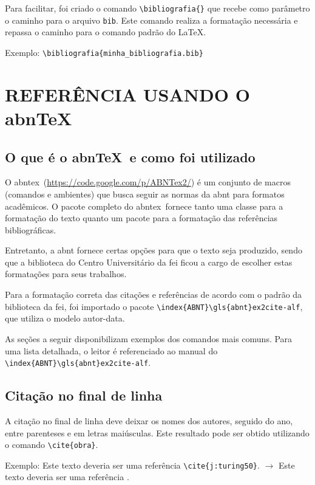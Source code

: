 \documentclass{fei}
\begin{document}
    Para facilitar, foi criado o comando \verb+\bibliografia{}+ que recebe como parâmetro o caminho para o arquivo \texttt{bib}. Este comando realiza a formatação necessária e repassa o caminho para o comando \verb++ padrão do \LaTeX.

    Exemplo: \verb+\bibliografia{minha_bibliografia.bib}+

\chapter{REFERÊNCIA USANDO O abn\TeX}\label{chap:referencia}

    \section{O que é o abn\TeX~e como foi utilizado}

    O \gls{abntex}~(\url{https://code.google.com/p/ABNTex2/}) é um conjunto de macros (comandos e ambientes) que busca seguir as normas da \gls{abnt} para formatos acadêmicos. O pacote completo do \gls{abntex}~fornece tanto uma classe para a formatação do texto quanto um pacote para a formatação das referências bibliográficas.

    Entretanto, a \gls{abnt} fornece certas opções para que o texto seja produzido, sendo que a biblioteca do Centro Universitário da \gls{fei} ficou a cargo de escolher estas formatações para seus trabalhos.

    Para a formatação correta das citações e referências de acordo com o padrão da biblioteca da \gls{fei}, foi importado o pacote \verb+\index{ABNT}\gls{abnt}ex2cite-alf+, que utiliza o modelo autor-data.

    As seções a seguir disponibilizam exemplos dos comandos mais comuns. Para uma lista detalhada, o leitor é referenciado ao manual do \verb+\index{ABNT}\gls{abnt}ex2cite-alf+.

    \section{Citação no final de linha}
    A citação no final de linha deve deixar os nomes dos autores, seguido do ano, entre parenteses e em letras maiúsculas. Este resultado pode ser obtido utilizando o comando \verb+\cite{obra}+.

    Exemplo: Este texto deveria ser uma referência \verb+\cite{j:turing50}+. $\to$ Este texto deveria ser uma referência \cite{j:turing50}.
\end{document}

